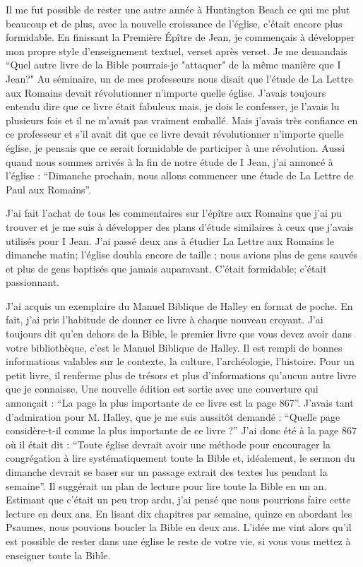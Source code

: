 Il me fut possible de rester une autre année à Huntington Beach ce qui me plut beaucoup et de plus, avec la nouvelle
croissance de l’église, c’était encore plus formidable. En finissant la Première Épître de Jean, je commençais à
développer mon propre style d’enseignement textuel, verset après verset. Je me demandais “Quel autre livre de la
Bible pourrais-je "attaquer" de la même manière que I Jean?" Au séminaire, un de mes professeurs nous disait que
l'étude de La Lettre aux Romains devait révolutionner n’importe quelle église. J’avais toujours entendu dire que ce
livre était fabuleux mais, je dois le confesser, je l’avais lu plusieurs fois et il ne m’avait pas vraiment emballé. Mais
j’avais très confiance en ce professeur et s’il avait dit que ce livre devait révolutionner n’importe quelle église, je
pensais que ce serait formidable de participer à une révolution. Aussi quand nous sommes arrivés à la fin de notre
étude de I Jean, j’ai annoncé à l’église : “Dimanche prochain, nous allons commencer une étude de La Lettre de Paul
aux Romains”.

J'ai fait l’achat de tous les commentaires sur l’épître aux Romains que j'ai pu trouver et je me suis à développer des
plans d’étude similaires à ceux que j’avais utilisés pour I Jean. J'ai passé deux ans à étudier La Lettre aux Romains le
dimanche matin; l’église doubla encore de taille ; nous avions plus de gens sauvés et plus de gens baptisés que
jamais auparavant. C’était formidable; c'était passionnant.

J'ai acquis un exemplaire du Manuel Biblique de Halley en format de poche. En fait, j'ai pris l’habitude de donner ce
livre à chaque nouveau croyant. J’ai toujours dit qu'en dehors de la Bible, le premier livre que vous devez avoir dans
votre bibliothèque, c'est le Manuel Biblique de Halley. Il est rempli de bonnes informations valables sur le contexte, la
culture, l’archéologie, l’histoire. Pour un petit livre, il renferme plus de trésors et plus d'informations qu’aucun autre
livre que je connaisse. Une nouvelle édition est sortie avec une couverture qui annonçait : “La page la plus importante
de ce livre est la page 867”. J'avais tant d'admiration pour M. Halley, que je me suis aussitôt demandé : “Quelle page
considère-t-il comme la plus importante de ce livre ?” J'ai donc été à la page 867 où il était dit : “Toute église devrait
avoir une méthode pour encourager la congrégation à lire systématiquement toute la Bible et, idéalement, le sermon
du dimanche devrait se baser sur un passage extrait des textes lus pendant la semaine”. Il suggérait un plan de
lecture pour lire toute la Bible en un an. Estimant que c’était un peu trop ardu, j'ai pensé que nous pourrions faire
cette lecture en deux ans. En lisant dix chapitres par semaine, quinze en abordant les Psaumes, nous pouvions
boucler la Bible en deux ans. L’idée me vint alors qu’il est possible de rester dans une église le reste de votre vie, si
vous vous mettez à enseigner toute la Bible.

